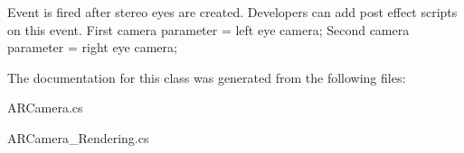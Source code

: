 Event is fired after stereo eyes are created. Developers can add post effect scripts on this event. First camera parameter = left eye camera; Second camera parameter = right eye camera; 



The documentation for this class was generated from the following files\+:\begin{DoxyCompactItemize}
\item 
A\+R\+Camera.\+cs\item 
A\+R\+Camera\+\_\+\+Rendering.\+cs\end{DoxyCompactItemize}
